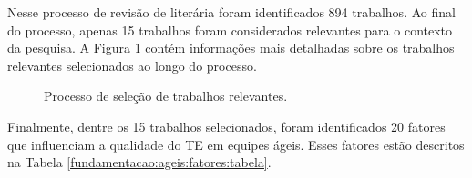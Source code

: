 Nesse processo de revisão de literária foram identificados 894 trabalhos. Ao final do processo, apenas 15 trabalhos foram considerados relevantes para o contexto da pesquisa. A Figura \ref{fundamentacao:ageis:fatores:revisao} contém informações mais detalhadas sobre os trabalhos relevantes selecionados ao longo do processo.

\begin{figure}[ht!]
\begin{center}
    \end{center}
    \caption{Processo de seleção de trabalhos relevantes.}
    \label{fundamentacao:ageis:fatores:revisao}
\end{figure}

Finalmente, dentre os 15 trabalhos selecionados, foram identificados 20 fatores que influenciam a qualidade do TE em equipes ágeis. Esses fatores estão descritos na Tabela \ref{fundamentacao:ageis:fatores:tabela}.

